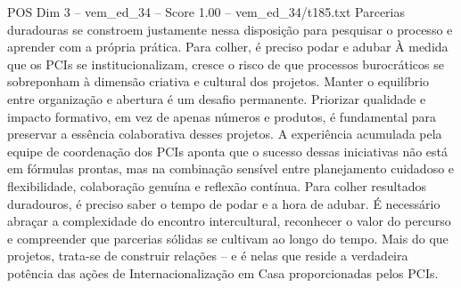 \begin{textsample}{POS Dim 3 – vem\_ed\_34 – Score 1.00 – vem\_ed\_34/t185.txt}
Parcerias duradouras se constroem justamente nessa disposição para pesquisar o processo e aprender com a própria prática.
Para colher, é preciso podar e adubar À medida que os PCIs se institucionalizam, cresce o risco de que processos burocráticos se sobreponham à dimensão criativa e cultural dos projetos.
Manter o equilíbrio entre organização e abertura é um desafio permanente.
Priorizar qualidade e impacto formativo, em vez de apenas números e produtos, é fundamental para preservar a essência colaborativa desses projetos.
A experiência acumulada pela equipe de coordenação dos PCIs aponta que o sucesso dessas iniciativas não está em fórmulas prontas, mas na combinação sensível entre planejamento cuidadoso e flexibilidade, colaboração genuína e reflexão contínua.
Para colher resultados duradouros, é preciso saber o tempo de podar e a hora de adubar.
É necessário abraçar a complexidade do encontro intercultural, reconhecer o valor do percurso e compreender que parcerias sólidas se cultivam ao longo do tempo.
Mais do que projetos, trata-se de construir relações – e é nelas que reside a verdadeira potência das ações de Internacionalização em Casa proporcionadas pelos PCIs.

\end{textsample}
